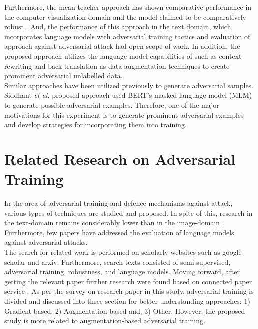 \documentclass[%
	BCOR=8mm, %
	DIV=12,
	toc=bibliography, %
	toc=listof, %
	oneside, %
	egregdoesnotlikesansseriftitles, %
	]{scrbook}
\begin{document}
Furthermore, the mean teacher approach has shown comparative performance in the computer visualization domain and the model claimed to be comparatively robust \cite{tarvainen_mean_2018}. And, the performance of this approach in the text domain, which incorporates language models with adversarial training tactics  and evaluation of approach against adversarial attack had open scope of work. In addition, the proposed approach utilizes the language model capabilities of such as context rewriting and back translation as data augmentation techniques to create prominent adversarial unlabelled data. \\
Similar approaches have been utilized previously to generate adversarial samples. Siddhant \textit{et al.}  \cite{garg_bae_2020}  proposed approach used BERT's masked language model (MLM) to generate possible adversarial examples. Therefore, one of the major motivations for this experiment is to generate prominent adversarial examples and develop strategies for incorporating them into training.

\chapter{Related Research on Adversarial Training}
\label{chapter:relatedwork}
In the area of adversarial training and defence mechanisms against attack, various types of techniques are studied and proposed. In spite of this, research in the text-domain remains considerably lower than in the image-domain \cite{wang_towards_2021}. Furthermore, few papers have addressed the evaluation of language models against adversarial attacks.\\
The search for related work is performed on scholarly websites such as google scholar and arxiv. Furthermore, search texts consisted of semi-supervised, adversarial training, robustness, and language models. Moving forward,  after getting the relevant paper further research were found based on connected paper service \cite{noauthor_connected_nodate-1}.
As per the survey on research paper in this study, adversarial training is divided and discussed into three section for better understanding approaches: 1) Gradient-based, 2) Augmentation-based and, 3) Other. However, the proposed study is more related to augmentation-based adversarial training.
\end{document}
